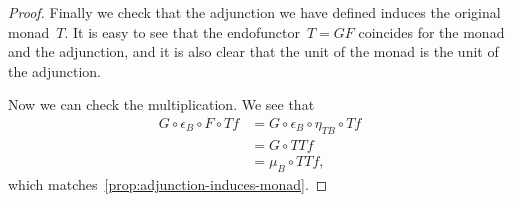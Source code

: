 \documentclass[../TFG.tex]{subfiles}
\begin{document}
\begin{proof}
    Finally we check that the adjunction we have defined induces the original
    monad~\(T\). It is easy to see that the endofunctor~\(T=GF\) coincides for
    the monad and the adjunction, and it is also clear that the unit of the
    monad is the unit of the adjunction.

    Now we can check the multiplication. We see that
    \begin{align*}
        G \circ \epsilon_{B} \circ F \circ Tf
            &= G \circ \epsilon_{B} \circ \eta_{TB} \circ Tf \\
            &= G \circ TTf \\
            &= \mu_{B} \circ TTf,
    \end{align*}
    which matches~\ref{prop:adjunction-induces-monad}.
\end{proof}
\end{document}
